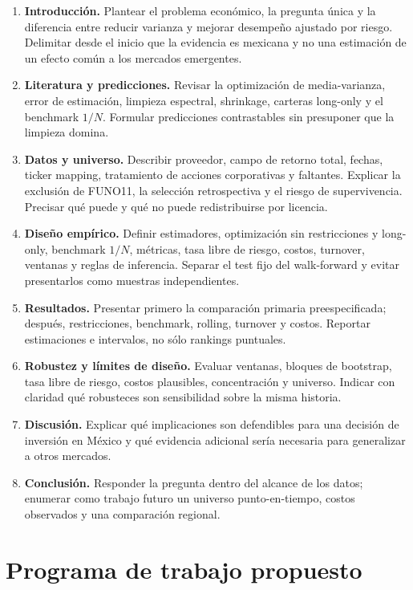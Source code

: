 \documentclass[11pt]{article}
\begin{document}
\begin{enumerate}
\item \textbf{Introducción.} Plantear el problema económico, la pregunta
única y la diferencia entre reducir varianza y mejorar desempeño ajustado por
riesgo. Delimitar desde el inicio que la evidencia es mexicana y no una
estimación de un efecto común a los mercados emergentes.
\item \textbf{Literatura y predicciones.} Revisar la optimización de
media-varianza, error de estimación, limpieza espectral, shrinkage, carteras
long-only y el benchmark $1/N$. Formular predicciones contrastables sin
presuponer que la limpieza domina.
\item \textbf{Datos y universo.} Describir proveedor, campo de retorno total,
fechas, ticker mapping, tratamiento de acciones corporativas y faltantes.
Explicar la exclusión de FUNO11, la selección retrospectiva y el riesgo de
supervivencia. Precisar qué puede y qué no puede redistribuirse por licencia.
\item \textbf{Diseño empírico.} Definir estimadores, optimización sin
restricciones y long-only, benchmark $1/N$, métricas, tasa libre de riesgo,
costos, turnover, ventanas y reglas de inferencia. Separar el test fijo del
walk-forward y evitar presentarlos como muestras independientes.
\item \textbf{Resultados.} Presentar primero la comparación primaria
preespecificada; después, restricciones, benchmark, rolling, turnover y
costos. Reportar estimaciones e intervalos, no sólo rankings puntuales.
\item \textbf{Robustez y límites de diseño.} Evaluar ventanas, bloques de
bootstrap, tasa libre de riesgo, costos plausibles, concentración y universo.
Indicar con claridad qué robusteces son sensibilidad sobre la misma historia.
\item \textbf{Discusión.} Explicar qué implicaciones son defendibles para una
decisión de inversión en México y qué evidencia adicional sería necesaria
para generalizar a otros mercados.
\item \textbf{Conclusión.} Responder la pregunta dentro del alcance de los
datos; enumerar como trabajo futuro un universo punto-en-tiempo, costos
observados y una comparación regional.
\end{enumerate}

\section{Programa de trabajo propuesto}
\end{document}
